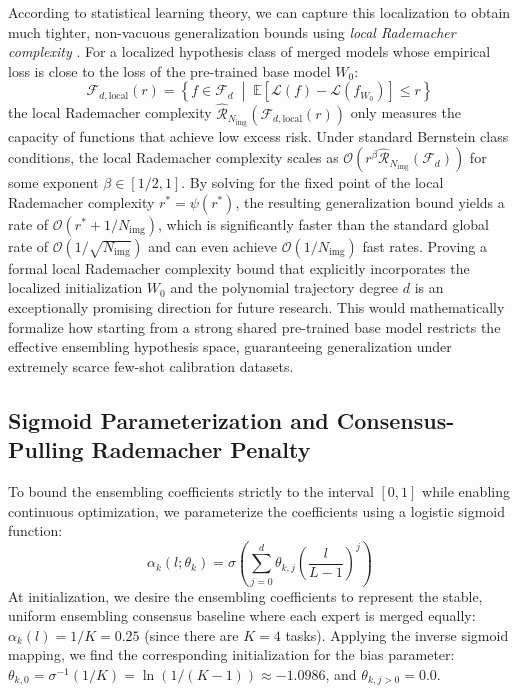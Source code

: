 According to statistical learning theory, we can capture this localization to obtain much tighter, non-vacuous generalization bounds using \emph{local Rademacher complexity} \cite{bartlett2005local}. For a localized hypothesis class of merged models whose empirical loss is close to the loss of the pre-trained base model $W_0$:
\begin{equation}
\label{eq:local_rademacher}
\mathcal{F}_{d, \text{local}}(r) = \left\{ f \in \mathcal{F}_d \;\middle|\; \mathbb{E}\left[\mathcal{L}(f) - \mathcal{L}(f_{W_0})\right] \le r \right\}
\end{equation}
the local Rademacher complexity $\widehat{\mathcal{R}}_{N_{\text{img}}}(\mathcal{F}_{d, \text{local}}(r))$ only measures the capacity of functions that achieve low excess risk. Under standard Bernstein class conditions, the local Rademacher complexity scales as $\mathcal{O}(r^{\beta} \widehat{\mathcal{R}}_{N_{\text{img}}}(\mathcal{F}_d))$ for some exponent $\beta \in [1/2, 1]$. By solving for the fixed point of the local Rademacher complexity $r^* = \psi(r^*)$, the resulting generalization bound yields a rate of $\mathcal{O}(r^* + 1/N_{\text{img}})$, which is significantly faster than the standard global rate of $\mathcal{O}(1/\sqrt{N_{\text{img}}})$ and can even achieve $\mathcal{O}(1/N_{\text{img}})$ fast rates. Proving a formal local Rademacher complexity bound that explicitly incorporates the localized initialization $W_0$ and the polynomial trajectory degree $d$ is an exceptionally promising direction for future research. This would mathematically formalize how starting from a strong shared pre-trained base model restricts the effective ensembling hypothesis space, guaranteeing generalization under extremely scarce few-shot calibration datasets.

\subsection{Sigmoid Parameterization and Consensus-Pulling Rademacher Penalty}
To bound the ensembling coefficients strictly to the interval $[0, 1]$ while enabling continuous optimization, we parameterize the coefficients using a logistic sigmoid function:
\begin{equation}
\alpha_k(l; \theta_k) = \sigma\left( \sum_{j=0}^d \theta_{k,j} \left(\frac{l}{L-1}\right)^j \right)
\end{equation}
At initialization, we desire the ensembling coefficients to represent the stable, uniform ensembling consensus baseline where each expert is merged equally: $\alpha_k(l) = 1/K = 0.25$ (since there are $K = 4$ tasks). Applying the inverse sigmoid mapping, we find the corresponding initialization for the bias parameter: $\theta_{k,0} = \sigma^{-1}(1/K) = \ln(1/(K-1)) \approx -1.0986$, and $\theta_{k,j>0} = 0.0$.

